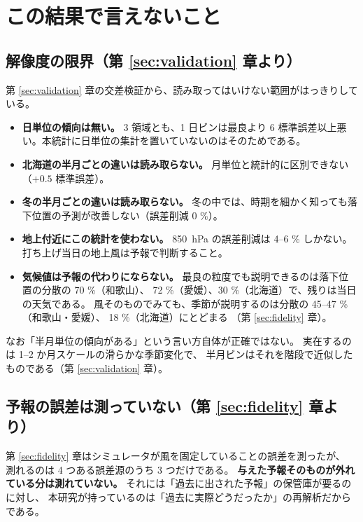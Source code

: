 \section{この結果で言えないこと}
\label{sec:limits}

\subsection{解像度の限界（第 \ref{sec:validation} 章より）}

第 \ref{sec:validation} 章の交差検証から、読み取ってはいけない範囲がはっきりしている。

\begin{itemize}
  \item \textbf{日単位の傾向は無い。} 3 領域とも、1 日ビンは最良より
        6 標準誤差以上悪い。本統計に日単位の集計を置いていないのはそのためである。
  \item \textbf{北海道の半月ごとの違いは読み取らない。}
        月単位と統計的に区別できない（$+0.5$ 標準誤差）。
  \item \textbf{冬の半月ごとの違いは読み取らない。}
        冬の中では、時期を細かく知っても落下位置の予測が改善しない（誤差削減 0 \%）。
  \item \textbf{地上付近にこの統計を使わない。}
        \SI{850}{\hecto\pascal} の誤差削減は 4--6 \% しかない。
        打ち上げ当日の地上風は予報で判断すること。
  \item \textbf{気候値は予報の代わりにならない。}
        最良の粒度でも説明できるのは落下位置の分散の 70 \%（和歌山）、
        72 \%（愛媛）、30 \%（北海道）で、残りは当日の天気である。
        風そのものでみても、季節が説明するのは分散の 45--47 \%（和歌山・愛媛）、
        18 \%（北海道）にとどまる
        （第 \ref{sec:fidelity} 章）。
\end{itemize}

なお「半月単位の傾向がある」という言い方自体が正確ではない。
実在するのは 1--2 か月スケールの滑らかな季節変化で、
半月ビンはそれを階段で近似したものである（第 \ref{sec:validation} 章）。

\subsection{予報の誤差は測っていない（第 \ref{sec:fidelity} 章より）}

第 \ref{sec:fidelity} 章はシミュレータが風を固定していることの誤差を測ったが、
測れるのは 4 つある誤差源のうち 3 つだけである。
\textbf{与えた予報そのものが外れている分は測れていない。}
それには「過去に出された予報」の保管庫が要るのに対し、
本研究が持っているのは「過去に実際どうだったか」の再解析だからである。


